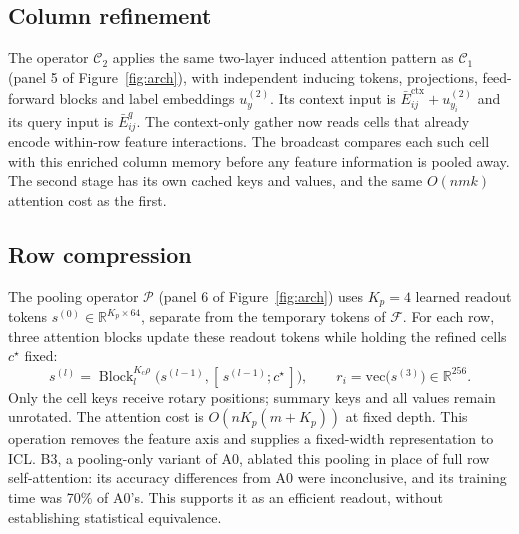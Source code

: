 \documentclass[11pt]{article}
\newcommand{\R}{\mathbb{R}}
\newcommand{\Block}{\operatorname{Block}}
\begin{document}
\subsection{Column refinement}
The operator $\mathcal{C}_2$ applies the same two-layer induced attention pattern as
$\mathcal{C}_1$ (panel 5 of Figure~\ref{fig:arch}), with independent inducing tokens, projections, feed-forward blocks and label
embeddings $u^{(2)}_y$. Its context input is $\bar E^{\mathrm{ctx}}_{ij}+u^{(2)}_{y_i}$ and its
query input is $\bar E^q_{ij}$. The context-only gather now reads cells that already encode
within-row feature interactions. The broadcast compares each such cell with this enriched column
memory before any feature information is pooled away. The second stage has its own cached keys
and values, and the same $O(nmk)$ attention cost as the first.

\subsection{Row compression}
The pooling operator $\mathcal{P}$ (panel 6 of Figure~\ref{fig:arch}) uses $K_p=4$ learned readout tokens
$s^{(0)}\in\R^{K_p\times64}$, separate from the temporary tokens of $\mathcal{F}$. For each row,
three attention blocks update these readout tokens while holding the refined cells $c^\star$ fixed:
\begin{equation}
s^{(l)}=\Block_l^{K_c\rho}\big(s^{(l-1)},[\,s^{(l-1)};c^\star\,]\big),\qquad
r_i=\mathrm{vec}\big(s^{(3)}\big)\in\R^{256}.
\end{equation}
Only the cell keys receive rotary positions; summary keys and all values remain unrotated.
The attention cost is $O(nK_p(m+K_p))$ at fixed depth. This operation removes the feature axis
and supplies a fixed-width representation to ICL. B3, a pooling-only variant of A0, ablated this pooling in place of full row
self-attention: its accuracy differences from A0 were inconclusive, and its training time was 70\%
of A0's. This supports it as an efficient readout, without establishing statistical equivalence.
\end{document}
